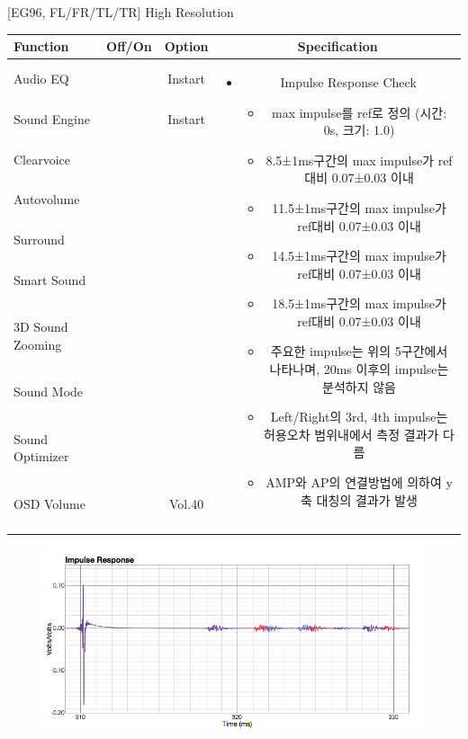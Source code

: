 \documentclass{beamer}
\begin{document}
\begin{frame}[t]{[EG96, FL/FR/TL/TR] High Resolution}
\begin{tiny}
\begin{tabular}{@{}lccc@{}}
\toprule
Function & Off/On & Option & Specification \\
\midrule
Audio EQ & \color{blue}{On} & Instart &
\multirow{10}{60mm}{
\begin{itemize}
\item Impulse Response Check
  \begin{itemize}
  \item max impulse를 ref로 정의 (시간: 0s, 크기: 1.0)
  \item 8.5±1ms구간의 max impulse가 ref대비 0.07±0.03 이내
  \item 11.5±1ms구간의 max impulse가 ref대비 0.07±0.03 이내
  \item 14.5±1ms구간의 max impulse가 ref대비 0.07±0.03 이내
  \item 18.5±1ms구간의 max impulse가 ref대비 0.07±0.03 이내
  \item 주요한 impulse는 위의 5구간에서 나타나며, 20ms 이후의 impulse는 분석하지 않음
  \item Left/Right의 3rd, 4th impulse는 허용오차 범위내에서 측정 결과가 다름
  \item AMP와 AP의 연결방법에 의하여 y축 대칭의 결과가 발생
  \end{itemize}
\end{itemize}
} \\
Sound Engine & \color{blue}{On} & Instart & \\
Clearvoice & \color{black}{Off} & & \\
Autovolume & \color{black}{Off} & & \\
Surround & \color{black}{Off} & & \\
Smart Sound & \color{black}{Off} & & \\
3D Sound Zooming & \color{black}{Off} & & \\
Sound Mode & \color{blue}{On} & \color{black}{Standard} & \\
Sound Optimizer & \color{black}{Off} & & \\
OSD Volume & \color{blue}{On} & Vol.40 & \\
 & & & \\
 & & & \\
\midrule
\end{tabular}
\end{tiny}

\begin{figure}[b]
\includegraphics[height=0.4\textwidth]{figure/EG96/highresolution.png}
\end{figure}

\end{frame}
\end{document}
